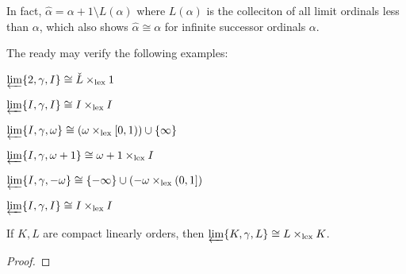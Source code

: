 \documentclass[11pt]{article}
\newcommand{\lexTimes}{\times_{\textrm{lex}}}
\begin{document}
  In fact, \(\hat\alpha=\alpha+1\setminus L(\alpha)\) where \(L(\alpha)\)
  is the colleciton of all limit ordinals less than \(\alpha\), which also
  shows \(\hat\alpha\cong\alpha\) for infinite successor ordinals \(\alpha\).

  \bigskip

  The ready may verify the following examples:

  \begin{example}
    \(\varprojlim\{2,\gamma,I\}\cong \check L\lexTimes 1\)
  \end{example}
  \begin{example}
    \(\varprojlim\{I,\gamma,I\}\cong I\lexTimes I\)
  \end{example}
  \begin{example}
    \(\varprojlim\{I,\gamma,\omega\}\cong (\omega\lexTimes[0,1))\cup\{\infty\}\)
  \end{example}
  \begin{example}
    \(\varprojlim\{I,\gamma,\omega+1\}\cong \omega+1\lexTimes I\)
  \end{example}
  \begin{example}
    \(\varprojlim\{I,\gamma,-\omega\}\cong \{-\infty\}\cup(-\omega\lexTimes(0,1])\)
  \end{example}
  \begin{example}
    \(\varprojlim\{I,\gamma,I\}\cong I\lexTimes I\)
  \end{example}

  \begin{theorem}
    If \(K,L\) are compact linearly orders, then
    \(\varprojlim\{K,\gamma,L\}\cong L\lexTimes K\).
  \end{theorem}

  \begin{proof}

  \end{proof}

\newpage


\end{document}
